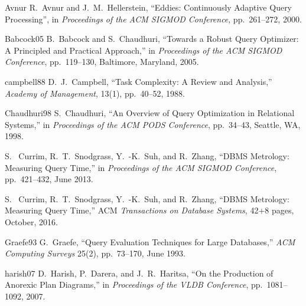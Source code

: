 \documentclass[prodmode,acmtods]{acmsmall}
\begin{document}

\newcommand{\etalchar}[1]{$^{#1}$}
\begin{thebibliography}{99}

\vspace{0.1em}
\bibitem
{Avnur}
R.~Avnur and J.~M.~Hellerstein, ``Eddies: Continuously Adaptive Query
Processing'', in {\em Proceedings of the ACM SIGMOD Conference},
pp.~261--272, 2000.

\bibitem
{Babcock05}
B.~Babcock and S.~Chaudhuri, ``Towards a Robust Query Optimizer: A
Principled and Practical Approach,'' in {\em Proceedings of the ACM SIGMOD
  Conference}, pp.~119--130, Baltimore, Maryland, 2005.

\bibitem
{campbell88}
D.~J.~Campbell, ``Task Complexity: A Review and Analysis,'' {\em Academy of Management}, 13(1), pp.~40--52, 1988. 

\bibitem
{Chaudhuri98}
S.~Chaudhuri, ``An Overview of Query Optimization in Relational Systems,'' in {\em Proceedings of the ACM PODS Conference}, pp.~34--43, Seattle, WA, 1998.


S.~ Currim, R.~T.~Snodgrass, Y.~-K.~Suh, and R.~Zhang,
``DBMS Metrology: Measuring Query Time,'' in {\em Proceedings of the ACM
  SIGMOD Conference}, pp.~421--432, June 2013.

S.~ Currim, R.~T.~Snodgrass, Y.~-K.~Suh, and R.~Zhang,
``DBMS Metrology: Measuring Query Time,'' ACM {\em Transactions
on Database Systems}, 42+8 pages, October, 2016.

\bibitem
{Graefe93}
G.~Graefe, ``Query Evaluation Techniques for Large Databases,'' {\em ACM
  Computing Surveys} 25(2), pp.~73--170, June 1993.

\bibitem
{harish07}
D.~Harish, P.~Darera, and J.~R.~Haritsa, ``On the Production of Anorexic
Plan Diagrams,'' in {\em Proceedings of the VLDB Conference},
pp.~1081--1092, 2007.


\end{thebibliography}
\end{document}
